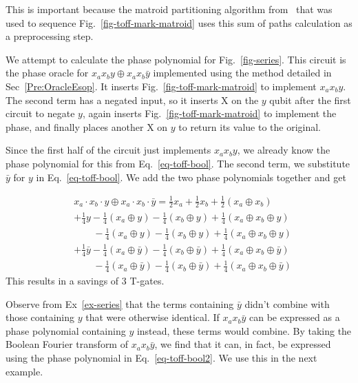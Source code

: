 This is important because the matroid partitioning algorithm from~\cite{bib-amy-matroid}
that was used to sequence Fig.~\ref{fig-toff-mark-matroid} uses this sum of paths
calculation as a preprocessing step. 

\begin{example}
  \label{ex-series}
  We attempt to calculate the phase polynomial for Fig.~\ref{fig-series}. This circuit
  is the phase oracle for $x_a x_b y \oplus x_a x_b \bar{y}$ implemented using
  the method detailed in Sec~\ref{Pre:OracleEsop}. It inserts
  Fig.~\ref{fig-toff-mark-matroid} to implement $x_a x_b y$. The second term has a negated
  input, so it inserts X on the $y$ qubit after the first circuit to negate $y$, again
  inserts Fig.~\ref{fig-toff-mark-matroid} to implement the phase, and finally places another
  X on $y$ to return its value to the original.

  Since the first half of the circuit just implements $x_a x_b y$, we already know
  the phase polynomial for this from Eq.~\ref{eq-toff-bool}. The second term, we
  substitute $\bar{y}$ for $y$ in Eq.~\ref{eq-toff-bool}. We add the two phase
  polynomials together and get

  \begin{equation}
    \label{eq-series}
    \begin{aligned}
      &x_a \cdot x_b \cdot y \oplus x_a \cdot x_b \cdot \bar{y} = \frac{1}{2}x_a +
      \frac{1}{2}x_b +\frac{1}{2}(x_a \oplus x_b) \\
      & + \frac{1}{4}y -\frac{1}{4}(x_a \oplus y) - \frac{1}{4}(x_b \oplus y) +
      \frac{1}{4}(x_a \oplus x_b \oplus y)\\
      &\qquad -\frac{1}{4}(x_a \oplus y) - \frac{1}{4}(x_b \oplus y) +
      \frac{1}{4}(x_a \oplus x_b \oplus y)\\
      & + \frac{1}{4}\bar{y} -\frac{1}{4}(x_a \oplus \bar{y})
      - \frac{1}{4}(x_b \oplus \bar{y}) +
      \frac{1}{4}(x_a \oplus x_b \oplus \bar{y})\\
      &\qquad -\frac{1}{4}(x_a \oplus \bar{y}) - \frac{1}{4}(x_b \oplus \bar{y}) +
      \frac{1}{4}(x_a \oplus x_b \oplus \bar{y})
    \end{aligned}
  \end{equation}
  This results in a savings of 3 T-gates. 
\end{example}

Observe from Ex~\ref{ex-series} that the terms containing $\bar{y}$ didn't combine with
those containing $y$ that were otherwise identical. If $x_a x_b \bar{y}$ can be expressed
as a phase polynomial containing $y$ instead, these terms would combine. By taking the
Boolean Fourier transform of $x_a x_b \bar{y}$, we find that it can, in fact, be expressed
using the phase polynomial in Eq.~\ref{eq-toff-bool2}. We use this in the next example.

